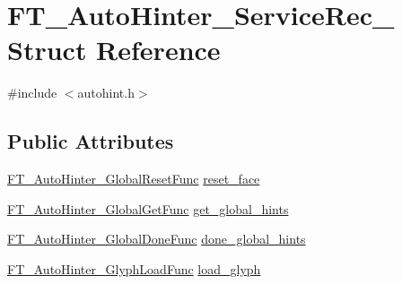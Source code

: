 \hypertarget{struct_f_t___auto_hinter___service_rec__}{\section{F\-T\-\_\-\-Auto\-Hinter\-\_\-\-Service\-Rec\-\_\- Struct Reference}
\label{struct_f_t___auto_hinter___service_rec__}
}


{\ttfamily \#include $<$autohint.\-h$>$}

\subsection*{Public Attributes}
\begin{DoxyCompactItemize}
\item 
\hyperlink{autohint_8h_aa6bc1f724ab3f7613d1e0e9b15067eac}{F\-T\-\_\-\-Auto\-Hinter\-\_\-\-Global\-Reset\-Func} \hyperlink{struct_f_t___auto_hinter___service_rec___a846234a9c9c5427d3274e4568f33272c}{reset\-\_\-face}
\item 
\hyperlink{autohint_8h_a17dd77a09d727a63cfb92c8741834b44}{F\-T\-\_\-\-Auto\-Hinter\-\_\-\-Global\-Get\-Func} \hyperlink{struct_f_t___auto_hinter___service_rec___a958371c33e08125393cd4b401a22f2a0}{get\-\_\-global\-\_\-hints}
\item 
\hyperlink{autohint_8h_a10934a79474a65f9d447ed4156287042}{F\-T\-\_\-\-Auto\-Hinter\-\_\-\-Global\-Done\-Func} \hyperlink{struct_f_t___auto_hinter___service_rec___a648ac943fc1194f60ba638e0a59486e9}{done\-\_\-global\-\_\-hints}
\item 
\hyperlink{autohint_8h_aed9426bdc488d4034d7dcef7c307a086}{F\-T\-\_\-\-Auto\-Hinter\-\_\-\-Glyph\-Load\-Func} \hyperlink{struct_f_t___auto_hinter___service_rec___ad36efe39469959626744ebdd04a04031}{load\-\_\-glyph}
\end{DoxyCompactItemize}


